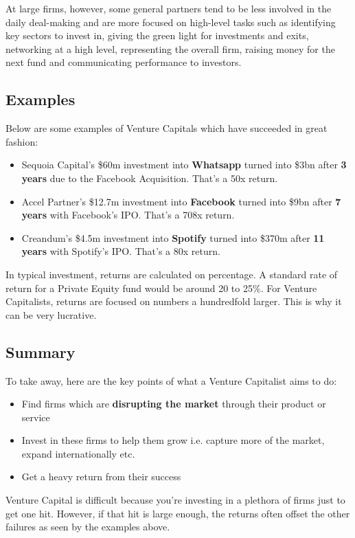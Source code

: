 \documentclass[a4paper]{article}
\begin{document}
{\vspace{5pt}
\noindent At large firms, however, some general partners tend to be less involved in the daily deal-making and are more focused on high-level tasks such as identifying key sectors to invest in, giving the green light for investments and exits, networking at a high level, representing the overall firm, raising money for the next fund and communicating performance to investors.

\subsection{Examples}
Below are some examples of Venture Capitals which have succeeded in great fashion:
\begin{itemize}
	\item Sequoia Capital's \$60m investment into \textbf{Whatsapp} turned into \$3bn after \textbf{3 years} due to the Facebook Acquisition. That's a 50x return.
	\item Accel Partner's \$12.7m investment into \textbf{Facebook} turned into \$9bn after \textbf{7 years} with Facebook's IPO. That's a 708x return.
	\item Creandum's \$4.5m investment into \textbf{Spotify} turned into \$370m after \textbf{11 years} with Spotify's IPO. That's a 80x return.
\end{itemize}
\vspace{5pt}
\noindent In typical investment, returns are calculated on percentage. A standard rate of return for a Private Equity fund would be around 20 to 25\%. For Venture Capitalists, returns are focused on numbers a hundredfold larger. This is why it can be very lucrative.

\subsection{Summary}
To take away, here are the key points of what a Venture Capitalist aims to do:
\begin{itemize}
	\item Find firms which are \textbf{disrupting the market} through their product or service
	\item Invest in these firms to help them grow i.e. capture more of the market, expand internationally etc.
	\item Get a heavy return from their success
\end{itemize}
\vspace{5pt}
Venture Capital is difficult because you're investing in a plethora of firms just to get one hit. However, if that hit is large enough, the returns often offset the other failures as seen by the examples above.

}
\end{document}
